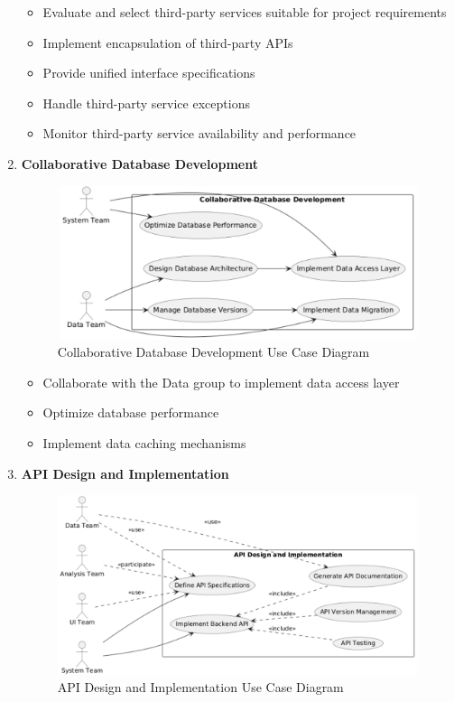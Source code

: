 \documentclass[a4paper,12pt]{article}
\begin{document}
\begin{enumerate}
  \begin{itemize}
    \item Evaluate and select third-party services suitable for project requirements
    \item Implement encapsulation of third-party APIs
    \item Provide unified interface specifications
    \item Handle third-party service exceptions
    \item Monitor third-party service availability and performance
  \end{itemize}
  
  \item \textbf{Collaborative Database Development}
  
  \begin{figure}[H]
    \centering
    \includegraphics[width=0.75\linewidth]{assets/image8_EG.png}
    \caption{Collaborative Database Development Use Case Diagram}
    \label{fig:database-development}
  \end{figure}
  
  \begin{itemize}
    \item Collaborate with the Data group to implement data access layer
    \item Optimize database performance
    \item Implement data caching mechanisms
  \end{itemize}
  
  \item \textbf{API Design and Implementation}
  
  \begin{figure}[H]
    \centering
    \includegraphics[width=0.75\linewidth]{assets/image4_EG.png}
    \caption{API Design and Implementation Use Case Diagram}
    \label{fig:api-design}
  \end{figure}
  

\end{enumerate}
\end{document}

